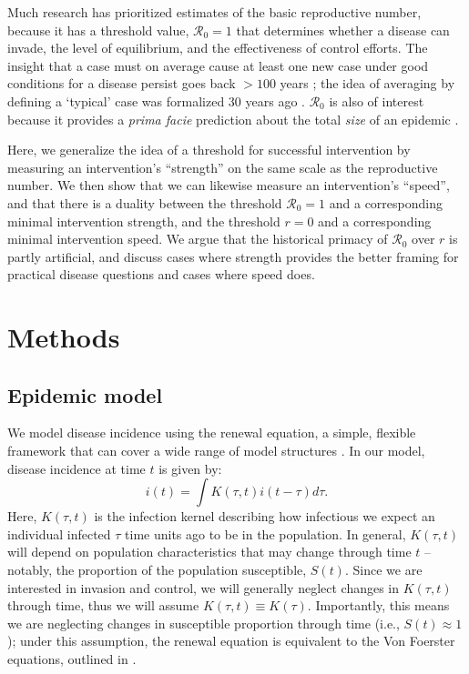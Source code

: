 \documentclass[12pt]{article}
\newcommand{\RR}{\ensuremath{{\mathcal R}}}
\begin{document}
Much research has prioritized estimates of the basic reproductive number, because it has a threshold value, $\RR_0=1$ that determines whether a disease can invade, the level of equilibrium, and the effectiveness of control efforts.
The insight that a case must on average cause at least one new case under good conditions for a disease persist goes back $>100$ years \citep{ross1911prevention};
the idea of averaging by defining a `typical' case was formalized 30 years ago \citep{diekmann1990definition}.
$\RR_0$ is also of interest because it provides a \emph{prima facie} prediction about the total \emph{size} of an epidemic \citep{anderson1991infectious, ma2006generality, arino2007final, andreasen2011final, miller2012note}.

Here, we generalize the idea of a threshold for successful intervention by measuring an intervention's ``strength'' on the same scale as the reproductive number. 
We then show that we can likewise measure an intervention's ``speed'', and that there is a duality between the threshold $\RR_0=1$ and a corresponding minimal intervention strength, and the threshold $r=0$ and a corresponding minimal intervention speed. 
We argue that the historical primacy of $\RR_0$ over $r$ is partly artificial, and discuss cases where strength provides the better framing for practical disease questions and cases where speed does.

\section{Methods}

\subsection{Epidemic model}

We model disease incidence using the renewal equation, a simple, flexible framework that can cover a wide range of model structures \citep{heesterbeek1996concept, diekmann2000mathematical, roberts2004modelling, aldis2005integral, wallinga2007generation, roberts2007model, Champredon2018equivalence}.
In our model, disease incidence at time $t$ is given by:
\begin{equation}
i(t) = \int K(\tau, t) i(t-\tau) d\tau.
\end{equation}
Here, $K(\tau, t)$ is the infection kernel describing how infectious we expect an individual infected $\tau$ time units ago to be in the population.
In general, $K(\tau, t)$ will depend on population characteristics that may change through time $t$ -- notably, the proportion of the population susceptible, $S(t)$.
Since we are interested in invasion and control, we will generally neglect changes in $K(\tau, t)$ through time, thus we will assume $K(\tau, t) \equiv K(\tau)$.
Importantly, this means we are neglecting changes in susceptible proportion through time (i.e., $S(t) \approx 1$);
under this assumption, the renewal equation is equivalent to the Von Foerster equations, outlined in \cite{fraser2004factors}.
\end{document}
